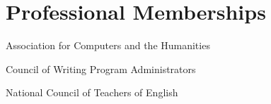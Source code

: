 \section{Professional Memberships}
Association for Computers and the Humanities

Council of Writing Program Administrators

National Council of Teachers of English